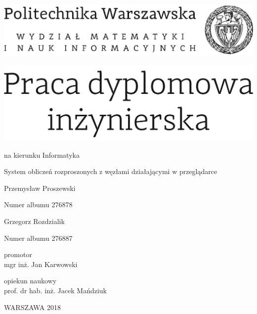 \documentclass[12pt,twoside,a4paper]{article}
\newcommand{\discipline}{Informatyka}
\renewcommand{\title}{System obliczeń rozproszonych z węzłami działającymi w przeglądarce}
\newcommand{\supervisor}{mgr inż. Jan Karwowski}
\renewcommand{\year}{2018}
\newcommand{\authori}{Przemysław Proszewski}
\newcommand{\albumi}{276878}
\newcommand{\authorii}{Grzegorz Rozdzialik}
\newcommand{\albumii}{276887}
\begin{document}
\pagestyle{empty}

\begin{center}

\includegraphics[scale=1.]{img/politechnika} 
\vspace{40pt}

\includegraphics[scale=1.]{img/praca_inz}  %

{ \arial na kierunku \discipline

\vspace{30pt}
{\arial \large \title}

\vspace{40pt}

{\arial \huge \authori }

\vspace{5pt}

Numer albumu \albumi

\vspace {20pt}
{\arial \huge \authorii}

\vspace{5pt}

Numer albumu \albumii

\vspace{40pt}

promotor \\
{\arial \supervisor}

\vspace{15pt}
 
opiekun naukowy  \\
{\arial prof. dr hab. inż. Jacek Mańdziuk }

 \vfill
WARSZAWA \year \\
}
\end{center}


%
%
\end{document}

